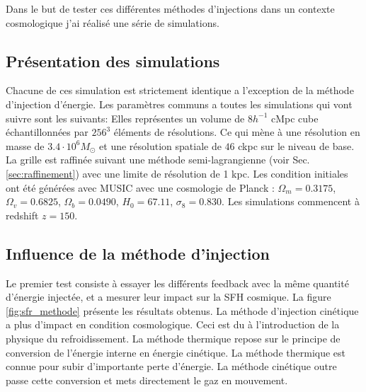 Dans le but de tester ces différentes méthodes d'injections dans un contexte cosmologique j'ai réalisé une série de simulations.


\subsection{Présentation des simulations}
\label{sec:pres_simu}
Chacune de ces simulation est strictement identique a l'exception de la méthode d'injection d'énergie.
Les paramètres communs a toutes les simulations qui vont suivre sont les suivants:
Elles représentes un volume de $8h^{-1}$ cMpc cube échantillonnées par $256^3$ éléments de résolutions. %
Ce qui mène à une résolution en masse de $3.4 \cdot 10^6 M_\odot$ et une résolution spatiale de $46$ ckpc sur le niveau de base.
La grille est raffinée suivant une méthode semi-lagrangienne (voir Sec. \ref{sec:raffinement}) avec une limite de résolution de 1 kpc.
Les condition initiales ont été générées avec MUSIC \citep{hahn_multi-scale_2011} avec une cosmologie de Planck \citep{planck_collaboration_planck_2016} : 
$\Omega_m=0.3175$, 
$\Omega_v=0.6825$,
$\Omega_b=0.0490$,
$H_0=67.11$,
$\sigma_8=0.830$. 
Les simulations commencent à redshift $z=150$.

\subsection{Influence de la méthode d'injection}

Le premier test consiste à essayer les différents feedback avec la même quantité d'énergie injectée, et a mesurer leur impact sur la \ac{SFH} cosmique.
La figure \ref{fig:sfr_methode} présente les résultats obtenus.
La méthode d'injection cinétique a plus d'impact en condition cosmologique.
Ceci est du à l'introduction de la physique du refroidissement.
La méthode thermique repose sur le principe de conversion de l'énergie interne en énergie cinétique.
La méthode thermique est connue %
pour subir d'importante perte d'énergie.
La méthode cinétique outre passe cette conversion et mets directement le gaz en mouvement.



